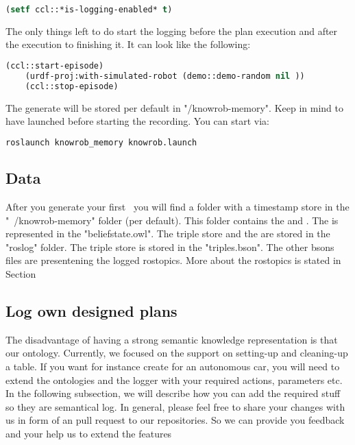 \begin{lstlisting}[language=lisp, caption=Enabling \neem Logging in a \cram plan]
	(setf ccl::*is-logging-enabled* t)
\end{lstlisting}

The only things left to do start the logging before the plan execution and after the execution to finishing it.
It can look like the following:
\begin{lstlisting}[language=lisp, caption=Steps to Record an Episode for a \cram Plan]
	(ccl::start-episode)
	(urdf-proj:with-simulated-robot (demo::demo-random nil ))
	(ccl::stop-episode)
\end{lstlisting}
	
The generate \neem will be stored per default in "\raisebox{-0.9ex}{\~{}}/knowrob-memory".
Keep in mind to  have \knowrob launched before starting the \neem recording. 
You can start \knowrob via:

\begin{lstlisting}[language=bash, caption=How to Start \knowrob]
	roslaunch knowrob_memory knowrob.launch
\end{lstlisting}

\subsection{Data}
After you generate your first \neem~you will find a folder with a timestamp store in the "~/knowrob-memory" folder (per default).
This folder contains the \neemnar and \neemexp . The \neemnar is represented in the "beliefstate.owl". The triple store and the \neemexp are stored in the "roslog" folder. The triple store is stored in the "triples.bson". The other bsons files are presentening the logged rostopics. More about the rostopics is stated in Section 

\subsection{Log own designed plans}
The disadvantage of having a strong semantic knowledge representation is that our ontology.
Currently, we focused on the support on setting-up and cleaning-up a table.
If you want for instance create \neems for an autonomous car, you will need to extend the \ease ontologies and the logger with your required actions, parameters etc.
In the following subsection, we will describe how you can add the required stuff so they are semantical log.
In general, please feel free to share your changes with us in form of an pull request to our repositories.
So we can provide you feedback and your help us to extend the features

